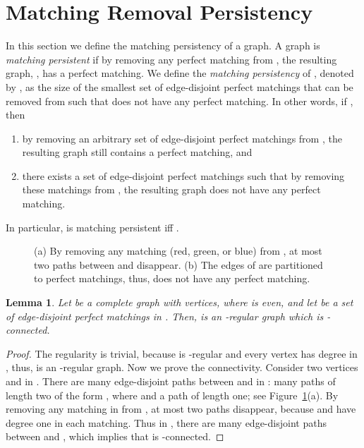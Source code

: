 \documentclass[11pt,a4paper]{article}
\newtheorem{lemma}{Lemma}
\begin{document}
\section{Matching Removal Persistency}
\label{persistency-section}
In this section we define the matching persistency of a graph. A graph  is {\em matching persistent} if by removing any perfect matching  from , the resulting graph, , has a perfect matching. We define the {\em matching persistency} of , denoted by , as the size of the smallest set  of edge-disjoint perfect matchings that can be removed from  such that  does not have any perfect matching. 
In other words, if , then

\begin{enumerate}
 \item by removing an arbitrary set of  edge-disjoint perfect matchings from , the resulting graph still contains a perfect matching, and 
\item there exists a set of  edge-disjoint perfect matchings such that by removing these matchings from , the resulting graph does not have any perfect matching.
\end{enumerate}

In particular,  is matching persistent iff .

\begin{figure}[htb]
  \centering
\setlength{\tabcolsep}{0in}
  
  \caption{(a) By removing any matching (red, green, or blue) from , at most two paths between  and  disappear. (b) The edges of  are partitioned to  perfect matchings, thus,  does not have any perfect matching.}
\label{path-matching}
\end{figure}

\begin{lemma}
\label{regularity-connectivity}
Let  be a complete graph with  vertices, where  is even, and let  be a set of  edge-disjoint perfect matchings in . Then,  is an -regular graph which is -connected.
\end{lemma}
\begin{proof}
The regularity is trivial, because  is -regular and every vertex has degree  in , thus,  is an -regular graph. Now we prove the connectivity. Consider two vertices  and  in . There are  many edge-disjoint paths between  and  in :  many paths of length two of the form , where  and a path  of length one; see Figure~\ref{path-matching}(a). By removing any matching in  from , at most two paths disappear, because  and  have degree one in each matching. Thus in , there are  many edge-disjoint paths between  and , which implies that  is -connected.
\end{proof}
\end{document}
